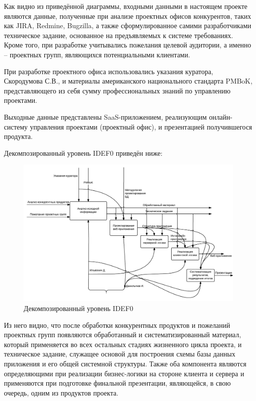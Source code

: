 \documentclass[14pt, a4paper]{extreport}
\begin{document}
Как видно из приведённой диаграммы, входными данными в настоящем проекте являются данные, полученные при анализе проектных офисов конкурентов, таких как JIRA, Redmine, Bugzilla, а также сформулированное самими разработчиками техническое задание, основанное на предъявляемых к системе требованиях. Кроме того, при разработке учитывались пожелания целевой аудитории, а именно -- проектных групп, являющихся потенциальными клиентами.

При разработке проектного офиса использовались указания куратора, Скородумова С.В., и материалы американского национального стандарта PMBoK, представляющего из себя сумму профессиональных знаний по управлению проектами.

Выходные данные представлены SaaS-приложением, реализующим онлайн-систему управления проектами (проектный офис), и презентацией получившегося продукта.

Декомпозированный уровень IDEF0 приведён ниже:

\vspace{1em}

\begin{figure}[!htb]
  \centering
    \includegraphics[scale=0.45]{../shared_images/idef0-decomposed.png}
   \caption{Декомпозированный уровень IDEF0}
    \label{fig:start}
\end{figure}

Из него видно, что после обработки конкурентных продуктов и пожеланий проектных групп появляются обработанный и систематизированный материал, который применяется во всех остальных стадиях жизненного цикла проекта, и техническое задание, служащее основой для построения схемы базы данных приложения и его общей системной структуры. Также оба компонента являются определяющими при реализации бизнес-логики на стороне клиента и сервера и применяются при подготовке финальной презентации, являющейся, в свою очередь, одним из продуктов проекта.
\end{document}
